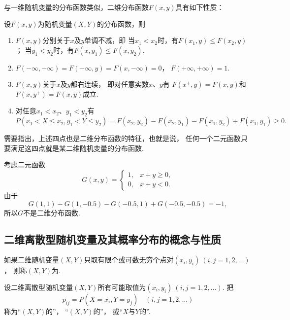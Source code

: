 与一维随机变量的分布函数类似，二维分布函数\(F(x,y)\)具有如下性质：
\begin{property}
设\(F(x,y)\)为随机变量\((X,Y)\)的分布函数，则
\begin{enumerate}
	\item \(F(x,y)\)分别关于\(x\)及\(y\)单调不减，即
	当\(x_1 < x_2\)时，有\(F(x_1,y) \leq F(x_2,y)\)；
	当\(y_1 < y_2\)时，有\(F(x,y_1) \leq F(x,y_2)\).

	\item \(F(-\infty,-\infty)=F(-\infty,y)=F(x,-\infty)=0\)，
	\(F(+\infty,+\infty)=1\).

	\item \(F(x,y)\)关于\(x\)及\(y\)都右连续，
	即对任意实数\(x\)、\(y\)有
	\(F(x^+,y)=F(x,y)\)和\(F(x,y^+)=F(x,y)\)成立.

	\item 对任意\(x_1 < x_2\)、\(y_1 < y_2\)有\[
		P(x_1 < X \leq x_2, y_1 < Y \leq y_2)
		= F(x_2,y_2) - F(x_2,y_1) - F(x_1,y_2) + F(x_1,y_1)
		\geq 0.
	\]
\end{enumerate}
\end{property}

需要指出，上述四点也是二维分布函数的特征，也就是说，
任何一个二元函数只要满足这四点就是某二维随机变量的分布函数.

\begin{example}
考虑二元函数\[
	G(x,y) = \left\{ \begin{array}{cl}
		1, & x+y\geq0, \\
		0, & x+y<0.
	\end{array} \right.
\]
由于\[
	G(1,1)-G(1,-0.5)-G(-0.5,1)+G(-0.5,-0.5)=-1,
\]
所以\(G\)不是二维分布函数.
\end{example}

\subsection{二维离散型随机变量及其概率分布的概念与性质}
\begin{definition}
如果二维随机变量\((X,Y)\)只取有限个或可数无穷个点对\((x_i,y_i)\ (i,j=1,2,\dotsc)\)，
则称\((X,Y)\)为.
\end{definition}

\begin{definition}
设二维离散型随机变量\((X,Y)\)所有可能取值为\((x_i,y_i)\ (i,j=1,2,\dotsc)\).
把\[
	p_{ij} = P(X = x_i, Y = y_j)
	\quad(i,j = 1,2,\dotsc)
\]称为“\((X,Y)\)的”，
“\((X,Y)\)的”，
或“\(X\)与\(Y\)的”.
\end{definition}

